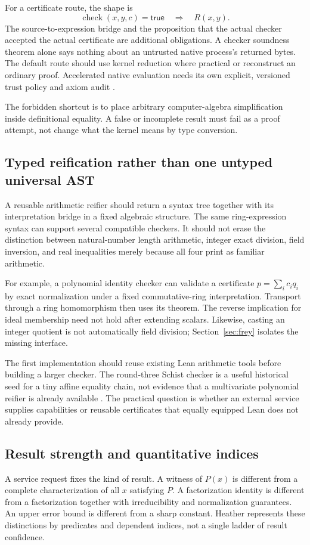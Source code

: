 \documentclass[11pt,letterpaper]{article}
\theoremstyle{definition}\newtheorem{definition}[theorem]{Definition}
\theoremstyle{remark}\newtheorem{remark}[theorem]{Remark}
\begin{document}
For a certificate route, the shape is
\[
 \operatorname{check}(x,y,c)=\mathsf{true}
 \quad\Longrightarrow\quad R(x,y).
\]
The source-to-expression bridge and the proposition that the actual checker
accepted the actual certificate are additional obligations. A checker soundness
theorem alone says nothing about an untrusted native process's returned bytes.
The default route should use kernel reduction where practical or reconstruct
an ordinary proof. Accelerated native evaluation needs its own explicit,
versioned trust policy and axiom audit \cite{round3a,round3b,lean-axioms}.

The forbidden shortcut is to place arbitrary computer-algebra simplification
inside definitional equality. A false or incomplete result must fail as a proof
attempt, not change what the kernel means by type conversion.

\subsection{Typed reification rather than one untyped universal AST}
A reusable arithmetic reifier should return a syntax tree together with its
interpretation bridge in a fixed algebraic structure. The same ring-expression
syntax can support several compatible checkers. It should not erase the
distinction between natural-number length arithmetic, integer exact division,
field inversion, and real inequalities merely because all four print as
familiar arithmetic.

For example, a polynomial identity checker can validate a certificate
$p=\sum_i c_iq_i$ by exact normalization under a fixed commutative-ring
interpretation. Transport through a ring homomorphism then uses its theorem.
The reverse implication for ideal membership need not hold after extending
scalars. Likewise, casting an integer quotient is not automatically field
division; Section~\ref{sec:frey} isolates the missing interface.

The first implementation should reuse existing Lean arithmetic tools before
building a larger checker. The round-three Schist checker is a useful
historical seed for a tiny affine equality chain, not evidence that a
multivariate polynomial reifier is already available \cite{round3a,round3b}.
The practical question is whether an external service supplies capabilities or
reusable certificates that equally equipped Lean does not already provide.

\subsection{Result strength and quantitative indices}
A service request fixes the kind of result. A witness of $P(x)$ is different
from a complete characterization of all $x$ satisfying $P$. A factorization
identity is different from a factorization together with irreducibility and
normalization guarantees. An upper error bound is different from a sharp
constant. Heather represents these distinctions by predicates and dependent
indices, not a single ladder of result confidence.
\end{document}
